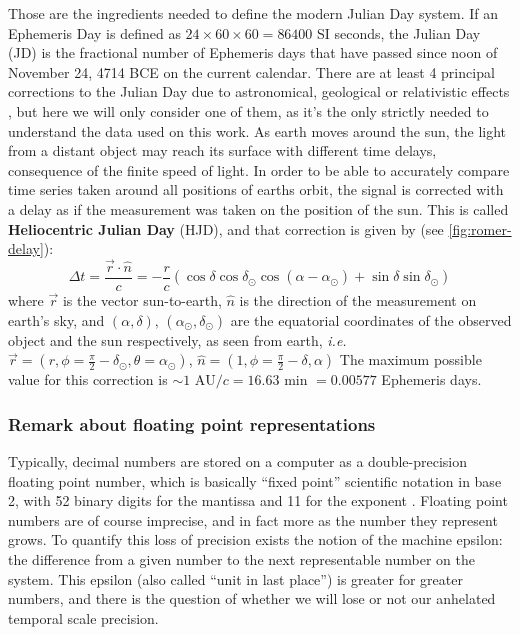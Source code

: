 	Those are the ingredients needed to define the modern Julian Day system. If an Ephemeris Day is defined as $24\times60\times60=86400$ SI seconds, 
	the Julian Day (JD) is the fractional number of Ephemeris days that have passed since noon of November 24, 4714 BCE on the current calendar. 
	There are at least 4 principal corrections to the Julian Day due to astronomical, geological or relativistic effects \citep{Eastman2010}, 
	but here we will only consider one of them, as it's the only strictly needed to understand the data used on this work.
	As earth moves around the sun, the light from a distant object may reach its surface with different time delays, consequence of the finite speed of light.
	In order to be able to accurately compare time series taken around all positions of earths orbit, 
	the signal is corrected with a delay as if the measurement was taken on the position of the sun.
	This is called \textbf{Heliocentric Julian Day} (HJD), and that correction is given by (see \autoref{fig:romer-delay}):
	\begin{equation}
		\Delta t = \frac{\vec{r}\cdot \hat{n}}{c} = - \frac{r}{c} \left(\cos\delta \cos \delta_{\odot}\cos(\alpha-\alpha_\odot)+ \sin\delta \sin \delta_\odot\right)
	\end{equation}
	where $\vec{r}$ is the vector sun-to-earth, $\hat{n}$ is the direction of the measurement on earth's sky, 
	and $(\alpha,\delta),\,(\alpha_\odot,\delta_\odot)$ are the equatorial coordinates of the observed object and the sun respectively, 
	as seen from earth, \textit{i.e.} $\vec{r} = (r,\phi=\frac\pi2-\delta_\odot,\theta=\alpha_\odot)$, $\hat n = (1,\phi=\frac\pi2-\delta,\alpha)$ 
	The maximum possible value for this correction is $\sim 1 \text{ AU}/c = 16.63 \text{ min } = 0.00577$ Ephemeris days.
	
	
	
	
	\subsubsection{Remark about floating point representations}
	
	
	Typically, decimal numbers are stored on a computer as a double-precision floating point number, 
	which is basically \enquote{fixed point} scientific notation in base 2, with 52 binary digits for the mantissa and 11 for the exponent \citep{IEEE2019}.
	Floating point numbers are of course imprecise, and in fact more as the number they represent grows. 
	To quantify this loss of precision exists the notion of the machine epsilon: 
	the difference from a given number to the next representable number on the system.
	This epsilon (also called \enquote{unit in last place}) is greater for greater numbers,
	and there is the question of whether we will lose or not our anhelated temporal scale precision.
	
